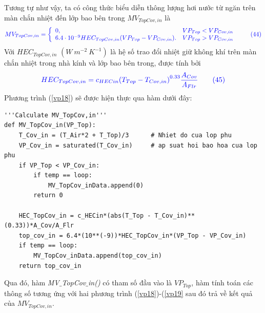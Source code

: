 \documentclass[13pt,a4paper]{article}
\begin{document}
			Tương tự như vậy, ta có công thức biểu diễn thông lượng hơi nước từ ngăn trên màn chắn nhiệt đến lớp bao bên trong $MV_{TopCov,in}$ là
			\begin{align}
				\color{blue}
				MV_{TopCov,in} = \left\{\begin{array}{llr}
					0,& VP_{Top} < VP_{Cov,in} \\
					6.4\cdot 10^{-9} HEC_{TopCov,in}(VP_{Top} - VP_{Cov,in}).& VP_{Top} > VP_{Cov,in}
				\end{array}\right.
				\color{blue}
				\tag{44}\label{vp18}
			\end{align}
			Với $HEC_{TopCov,in}$ $(W\ m^{-2}\ K^{-1})$ là hệ số trao đổi nhiệt giữ không khí trên màn chắn nhiệt trong nhà kính và lớp bao bên trong, được tính bởi
			\begin{align}
				\color{blue}
				HEC_{TopCov,in} = c_{HECin}{(T_{Top} - T_{Cov,in})}^{0.33}\frac{A_{Cov}}{A_{Flr}}
				\color{blue}
				\tag{45}\label{vp19}
			\end{align}
			Phương trình (\ref{vp18}) sẽ được hiện thực qua hàm dưới đây:
\begin{lstlisting}
'''Calculate MV_TopCov,in'''
def MV_TopCov_in(VP_Top):
	T_Cov_in = (T_Air*2 + T_Top)/3 		# Nhiet do cua lop phu
	VP_Cov_in = saturated(T_Cov_in) 	# ap suat hoi bao hoa cua lop phu
	if VP_Top < VP_Cov_in:
		if temp == loop: 
			MV_TopCov_inData.append(0)
		return 0
	
	HEC_TopCov_in = c_HECin*(abs(T_Top - T_Cov_in)**(0.33))*A_Cov/A_Flr
	top_cov_in = 6.4*(10**(-9))*HEC_TopCov_in*(VP_Top - VP_Cov_in)
	if temp == loop: 
		MV_TopCov_inData.append(top_cov_in)
	return top_cov_in
\end{lstlisting}
			Qua đó, hàm \textit{MV$\_$TopCov$\_$in()} có tham số đầu vào là $VP_{Top}$, hàm tính toán các thông số tương ứng với hai phương trình (\ref{vp18})-(\ref{vp19} sau đó trả về kết quả của $MV_{TopCov,in}$. \\ \\
			
\end{document}
